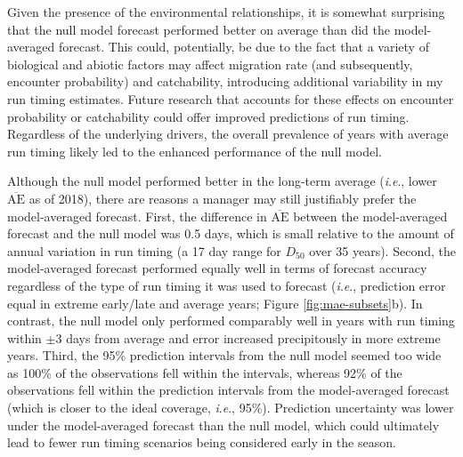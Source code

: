 \documentclass[12pt,]{book}
\theoremstyle{definition}
\theoremstyle{definition}
\theoremstyle{definition}
\theoremstyle{remark}
\begin{document}
Given the presence of the environmental relationships, it is somewhat
surprising that the null model forecast performed better on average than
did the model-averaged forecast. This could, potentially, be due to the
fact that a variety of biological \citetext{\citealp[size;
\emph{e}.\emph{g}.,][ and
morphology]{bromaghin-2005}; \citealp{hamon-etal-2000}} and abiotic
factors \citetext{\citealp[temperature; \emph{e}.\emph{g}.,][river
discharge]{salinger-anderson-2006}; \citealp[\emph{e}.\emph{g}.,][and
migration
distance]{keefer-etal-2004}; \citealp[\emph{e}.\emph{g}.,][]{eiler-etal-2015}}
may affect migration rate (and subsequently, encounter probability) and
catchability, introducing additional variability in my run timing
estimates. Future research that accounts for these effects on encounter
probability or catchability could offer improved predictions of run
timing. Regardless of the underlying drivers, the overall prevalence of
years with average run timing likely led to the enhanced performance of
the null model.

Although the null model performed better in the long-term average
(\emph{i}.\emph{e}., lower \(\overline{\text{AE}}\) as of 2018), there
are reasons a manager may still justifiably prefer the model-averaged
forecast. First, the difference in \(\overline{\text{AE}}\) between the
model-averaged forecast and the null model was 0.5 days, which is small
relative to the amount of annual variation in run timing (a 17 day range
for \(D_{50}\) over 35 years). Second, the model-averaged forecast
performed equally well in terms of forecast accuracy regardless of the
type of run timing it was used to forecast (\emph{i}.\emph{e}.,
prediction error equal in extreme early/late and average years; Figure
\ref{fig:mae-subsets}b). In contrast, the null model only performed
comparably well in years with run timing within \(\pm 3\) days from
average and error increased precipitously in more extreme years. Third,
the 95\% prediction intervals from the null model seemed too wide as
100\% of the observations fell within the intervals, whereas 92\% of the
observations fell within the prediction intervals from the
model-averaged forecast (which is closer to the ideal coverage,
\emph{i}.\emph{e}., 95\%). Prediction uncertainty was lower under the
model-averaged forecast than the null model, which could ultimately lead
to fewer run timing scenarios being considered early in the season.
\end{document}
